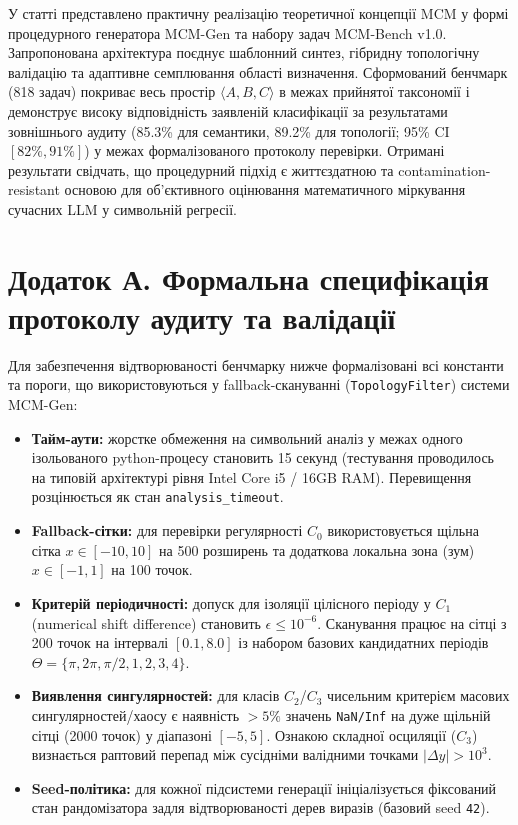 \documentclass[11pt]{article}
\begin{document}
У статті представлено практичну реалізацію теоретичної концепції MCM у формі процедурного генератора MCM-Gen та набору задач MCM-Bench v1.0. Запропонована архітектура поєднує шаблонний синтез, гібридну топологічну валідацію та адаптивне семплювання області визначення. Сформований бенчмарк (818 задач) покриває весь простір $\langle A,B,C\rangle$ в межах прийнятої таксономії і демонструє високу відповідність заявленій класифікації за результатами зовнішнього аудиту (85.3\% для семантики, 89.2\% для топології; 95\% CI $[82\%, 91\%]$) у межах формалізованого протоколу перевірки. Отримані результати свідчать, що процедурний підхід є життєздатною та contamination-resistant основою для об'єктивного оцінювання математичного міркування сучасних LLM у символьній регресії.

\section*{Додаток А. Формальна специфікація протоколу аудиту та валідації}

Для забезпечення відтворюваності бенчмарку нижче формалізовані всі константи та пороги, що використовуються у fallback-скануванні (\texttt{TopologyFilter}) системи MCM-Gen:

\begin{itemize}[leftmargin=1.5em]
  \item \textbf{Тайм-аути:} жорстке обмеження на символьний аналіз у межах одного ізольованого python-процесу становить 15 секунд (тестування проводилось на типовій архітектурі рівня Intel Core i5 / 16GB RAM). Перевищення розцінюється як стан \texttt{analysis\_timeout}.
  \item \textbf{Fallback-сітки:} для перевірки регулярності $C_0$ використовується щільна сітка $x \in [-10, 10]$ на 500 розширень та додаткова локальна зона (зум) $x \in [-1, 1]$ на 100 точок.
  \item \textbf{Критерій періодичності:} допуск для ізоляції цілісного періоду у $C_1$ (numerical shift difference) становить $\epsilon \le 10^{-6}$. Сканування працює на сітці з 200 точок на інтервалі $[0.1, 8.0]$ із набором базових кандидатних періодів $\Theta = \{\pi, 2\pi, \pi/2, 1, 2, 3, 4\}$.
  \item \textbf{Виявлення сингулярностей:} для класів $C_2$/$C_3$ чисельним критерієм масових сингулярностей/хаосу є наявність $>5\%$ значень \texttt{NaN/Inf} на дуже щільній сітці (2000 точок) у діапазоні $[-5, 5]$. Ознакою складної осциляції ($C_3$) визнається раптовий перепад між сусідніми валідними точками $|\Delta y| > 10^3$.
  \item \textbf{Seed-політика:} для кожної підсистеми генерації ініціалізується фіксований стан рандомізатора задля відтворюваності дерев виразів (базовий seed \texttt{42}).
\end{itemize}
\end{document}
